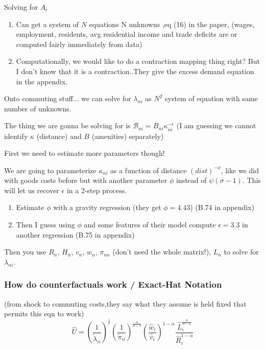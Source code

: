 \documentclass{article}
\begin{document}
Solving for $A_i$
\begin{enumerate}
\item Can get a system of $N$ equations N unknowns ,eq (16) in the paper,  (wages, employment, residents, avg residential income and trade deficits are or computed fairly immediately from data)
\item Computationally, we would like to do a contraction mapping thing right? But I don't know that it is a contraction..They give the excess demand equation in the appendix. 
\end{enumerate}

Onto commuting stuff... we can solve for $\lambda_{ni}$ as $N^2$ system of equation with same number of unknowns.


The thing we are gonna be solving for is $\mathcal{B}_{ni} = B_{ni}\kappa_{ni}^{-\epsilon}$ (I am guessing we cannot identify $\kappa$ (distance) and $B$ (amenities) separately)



First we need to estimate more parameters though!

We are going to parameterize $\kappa_{ni}$ as a function of distance $(dist)^{-\phi}$, like we did with goods costs before but with another parameter $\phi$ instead of $\psi(\sigma-1)$. This will let us recover $\epsilon$ in a 2-step process. 

\begin{enumerate}
\item Estimate $\phi$ with a gravity regression (they get $\phi = 4.43$) (B.74 in appendix)
 \item Then I guess using $\phi$ and some features of their model compute $\epsilon=3.3$ in another regression (B.75 in appendix)
\end{enumerate}

Then you use $R_n$, $H_n$, $v_n$, $w_n$,  $\pi_{nn}$ (don't need the whole matrix!), $L_n$
to solve for $\lambda_{ni}$.
\subsubsection{How do counterfactuals work / Exact-Hat Notation }


(from shock to commuting costs,they say what they assume is held fixed that permits this eqn to work)
\begin{equation}
\hat{U} = \left(\frac{1}{\tilde{\lambda}_{ii}}\right)^{\frac{1}{\epsilon}} \left(\frac{1}{\tilde{\pi}_{ii}}\right)^{\frac{\alpha}{\sigma-1}} \left(\frac{\hat{w}_i}{\hat{v}_i}\right)^{1-\alpha} \frac{\hat{L}_i^{\frac{\alpha}{\sigma-1}}}{\hat{R}_i^{1-\alpha}}
\end{equation}
\end{document}
